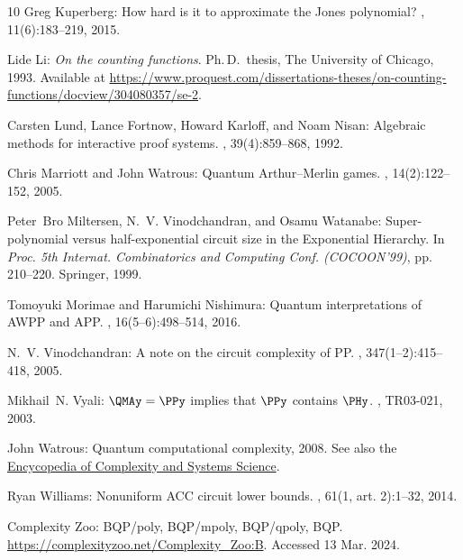 \begin{thebibliography}{10}
{\sc Greg Kuperberg}: How hard is it to approximate the {J}ones polynomial?
, 11(6):183--219, 2015.

{\sc Lide Li}: {\em On the counting functions}.
\newblock Ph.\,D.\ thesis, The University of Chicago, 1993.
\newblock Available at
  \url{https://www.proquest.com/dissertations-theses/on-counting-functions/docview/304080357/se-2}.

{\sc Carsten Lund, Lance Fortnow, Howard Karloff, and Noam Nisan}: Algebraic
  methods for interactive proof systems.
, 39(4):859--868, 1992.
\newblock [\epfmtdoi{10.1145/146585.146605}]

{\sc Chris Marriott and John Watrous}: Quantum {A}rthur--{M}erlin games.
, 14(2):122--152, 2005.
\newblock [\epfmtdoi{10.1007/s00037-005-0194-x}]

{\sc Peter~Bro Miltersen, N.~V. Vinodchandran, and Osamu Watanabe}:
  Super-polynomial versus half-exponential circuit size in the {E}xponential
  {H}ierarchy.
\newblock In {\em Proc. 5th Internat. Combinatorics and Computing Conf.
  (COCOON'99)}, pp. 210--220. Springer, 1999.
\newblock [\epfmtdoi{10.1007/3-540-48686-0\_21}]

{\sc Tomoyuki Morimae and Harumichi Nishimura}: Quantum interpretations of
  {AWPP} and {APP}.
, 16(5--6):498--514, 2016.

{\sc N.~V. Vinodchandran}: A note on the circuit complexity of {PP}.
, 347(1--2):415--418, 2005.

{\sc Mikhail~N. Vyali}: {$\QMAy=\PPy$} implies that {$\PPy$} contains {$\PHy$}.
, TR03-021, 2003.

{\sc John Watrous}: Quantum computational complexity, 2008.
\newblock See also the
  \href{https://link.springer.com/rwe/10.1007/978-0-387-30440-3\_428}{Encycopedia
  of Complexity and Systems Science}.

{\sc Ryan Williams}: Nonuniform {ACC} circuit lower bounds.
, 61(1, art. 2):1--32, 2014.
\newblock [\epfmtdoi{10.1145/2559903}]

Complexity {Z}oo: {BQP/poly}, {BQP/mpoly}, {BQP/qpoly}, {BQP}.
\newblock \url{https://complexityzoo.net/Complexity_Zoo:B}. Accessed 13 Mar.
  2024.

\end{thebibliography}